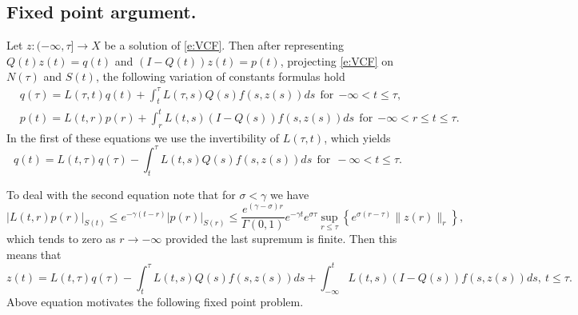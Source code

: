 \documentclass[a4paper,11pt,reqno]{amsart}
\theoremstyle{plain}
\theoremstyle{definition}
\numberwithin{equation}{section}
\renewcommand{\leq}{\leqslant}
\begin{document}
\subsection{Fixed point argument.}\label{subsec:ZET} 

 Let $z\colon(-\infty,\tau]\to X$ be a solution of \eqref{e:VCF}. 
 Then after representing $Q(t)z(t) = q(t)$ and $(I-Q(t))z(t)=p(t)$, projecting \eqref{e:VCF} on $N(\tau)$ and {$S(t)$}, the following variation of constants formulas hold
\begin{align*}
    & q(\tau)=L(\tau,t)q(t)+\int_{t}^{\tau}L(\tau,s)Q(s)f(s,z(s))ds\ \ \text{for}\ \ {-\infty<t\leq\tau},\\
    & p(t)=L(t,r)p(r)+\int_{r}^{t}L(t,s)(I-Q(s))f(s,z(s))ds\ \ \text{for}\ \  {-\infty<r\leq t\leq\tau.}
\end{align*}
In the first of these equations we use the invertibility of $L(\tau,t)$, which yields
$$q(t) = L(t,\tau)q(\tau)-\int_{t}^{\tau}L(t,s)Q(s)f(s,z(s))ds\ \ \text{for}\ \  -\infty<t\leq\tau.$$

To deal with  the second equation note that for $\sigma<\gamma$ we have
$$
|L(t,r)p(r)|_{S(t)} \leq e^{-\gamma(t-r)}|p(r)|_{S(r)} \leq \frac{e^{(\gamma-\sigma)r}}{\Gamma(0,1)}e^{-\gamma t}e^{\sigma\tau}\sup_{r\leq \tau}\left\{e^{\sigma(r-\tau)}\|z(r)\|_r\right\},$$
which tends to zero as $r\to -\infty$ provided the last supremum is finite. Then this means that
\begin{equation}\label{eq:fixed_point}
z(t) = L(t,\tau)q(\tau)-\int_{t}^{\tau}L(t,s)Q(s)f(s,z(s))ds  + \int_{-\infty}^{t}L(t,s)(I-Q(s))f(s,z(s))ds,\ {t\leq\tau.}
\end{equation}
Above equation motivates the following fixed point problem.
\end{document}
